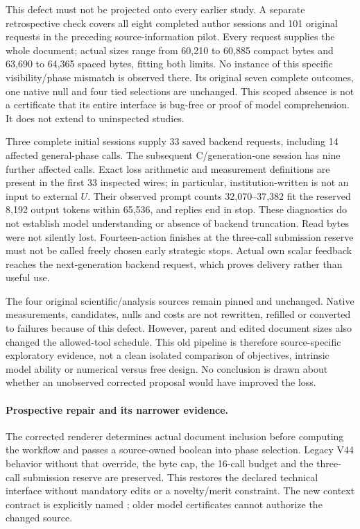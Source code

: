 This defect must not be projected onto every earlier study. A separate
retrospective check covers all eight completed author sessions and 101 original
requests in the preceding source-information pilot. Every request supplies
the whole document; actual sizes range from 60,210 to 60,885 compact bytes
and 63,690 to 64,365 spaced bytes, fitting both limits. No instance of this
specific visibility/phase mismatch is observed there. Its original seven
complete outcomes, one native null and four tied selections are unchanged.
This scoped absence is not a certificate that its entire interface is bug-free
or proof of model comprehension. It does not extend to uninspected studies.

Three complete initial sessions supply 33 saved backend requests, including
14 affected general-phase calls. The subsequent C/generation-one session has
nine further affected calls. Exact loss arithmetic and measurement definitions
are present in the first 33 inspected wires; in particular, institution-written
 is not an input to external $U$. Their observed prompt counts
32,070--37,382 fit the reserved 8,192 output tokens within 65,536, and replies
end in stop. These diagnostics do not establish model understanding or absence
of backend truncation. Read bytes were not silently lost. Fourteen-action
finishes at the three-call submission reserve must not be called freely chosen
early strategic stops. Actual own scalar feedback reaches the next-generation
backend request, which proves delivery rather than useful use.

The four original scientific/analysis sources remain pinned and unchanged.
Native measurements, candidates, nulls and costs are not rewritten, refilled
or converted to failures because of this defect. However, parent and edited
document sizes also changed the allowed-tool schedule. This old pipeline is
therefore source-specific exploratory evidence, not a clean isolated comparison
of objectives, intrinsic model ability or numerical versus free design.
No conclusion is drawn about whether an unobserved corrected proposal would
have improved the loss.

\paragraph{Prospective repair and its narrower evidence.}
The corrected renderer determines actual document inclusion before computing
the workflow and passes a source-owned boolean into phase selection. Legacy
V44 behavior without that override, the byte cap, the 16-call budget and the
three-call submission reserve are preserved. This restores the declared
technical interface without mandatory edits or a novelty/merit constraint.
The new context contract is explicitly named
; older model certificates
cannot authorize the changed source.

